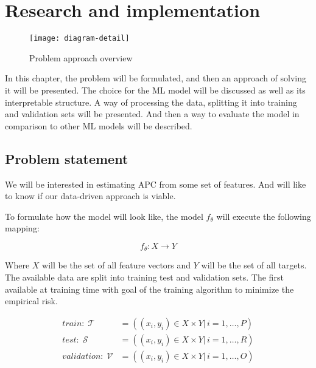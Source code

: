 \chapter{Research and implementation}
\label{ch:problem}

\begin{figure}[hb]
    \texttt{[image: diagram-detail]}
    \caption[Problem modelling overview]{Problem approach overview}
\end{figure}

In this chapter, the problem will be formulated, and then an approach of solving it will be presented. The choice for the ML model will be discussed as well as its interpretable structure. A way of processing the data, splitting it into training and validation sets will be presented. And then a way to evaluate the model in comparison to other ML models will be described.

\section{Problem statement}



We will be interested in estimating \acrfull{APC} from some set of features. And will like to know if our data-driven approach is viable.

To formulate how the model will look like, the model $f_\theta$ will execute the following mapping:

\[
    f_{\theta}: X \rightarrow Y
\]

Where $X$ will be the set of all feature vectors and $Y$ will be the set of all targets. The available data are split into training test and validation sets. The first available at training time with goal of the training algorithm to minimize the empirical risk.


\begin{equation}
    \begin{split}
        \textit{train}:      \; \mathcal{T} & = ((x_i, y_i) \in X \times Y |\, i = 1,\dots, P) \\
        \textit{test}:       \; \mathcal{S} & = ((x_i, y_i) \in X \times Y |\, i = 1,\dots, R) \\
        \textit{validation}: \; \mathcal{V} & = ((x_i, y_i) \in X \times Y |\, i = 1,\dots, O)
    \end{split}
\end{equation}


